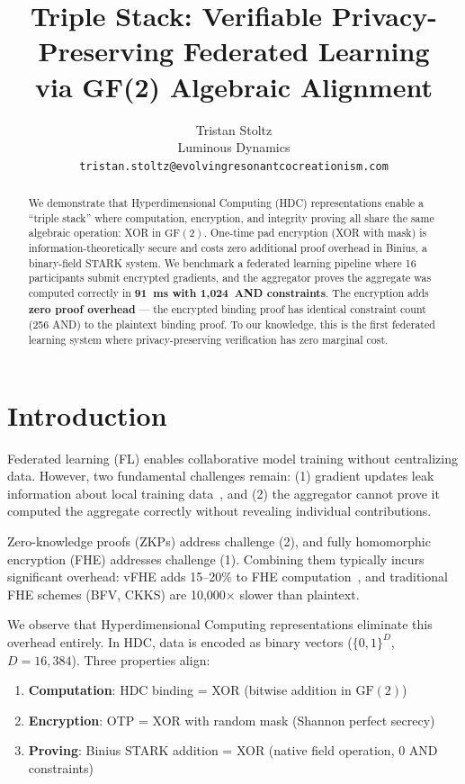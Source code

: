 \documentclass[11pt]{article}
\title{Triple Stack: Verifiable Privacy-Preserving Federated Learning\\via GF(2) Algebraic Alignment}
\author{
Tristan Stoltz\\
Luminous Dynamics\\
\texttt{tristan.stoltz@evolvingresonantcocreationism.com}
}
\begin{document}
\maketitle

\begin{abstract}
We demonstrate that Hyperdimensional Computing (HDC) representations enable a ``triple stack'' where computation, encryption, and integrity proving all share the same algebraic operation: XOR in $\mathrm{GF}(2)$. One-time pad encryption (XOR with mask) is information-theoretically secure and costs zero additional proof overhead in Binius, a binary-field STARK system. We benchmark a federated learning pipeline where 16 participants submit encrypted gradients, and the aggregator proves the aggregate was computed correctly in \textbf{91~ms with 1,024~AND constraints}. The encryption adds \textbf{zero proof overhead} --- the encrypted binding proof has identical constraint count (256 AND) to the plaintext binding proof. To our knowledge, this is the first federated learning system where privacy-preserving verification has zero marginal cost.
\end{abstract}

\section{Introduction}

Federated learning (FL) enables collaborative model training without centralizing data. However, two fundamental challenges remain: (1) gradient updates leak information about local training data~\cite{bonawitz2017practical}, and (2) the aggregator cannot prove it computed the aggregate correctly without revealing individual contributions.

Zero-knowledge proofs (ZKPs) address challenge (2), and fully homomorphic encryption (FHE) addresses challenge (1). Combining them typically incurs significant overhead: vFHE adds 15--20\% to FHE computation~\cite{vfhe2023}, and traditional FHE schemes (BFV, CKKS) are 10,000$\times$ slower than plaintext.

We observe that Hyperdimensional Computing representations eliminate this overhead entirely. In HDC, data is encoded as binary vectors ($\{0,1\}^D$, $D = 16{,}384$). Three properties align:

\begin{enumerate}
    \item \textbf{Computation}: HDC binding = XOR (bitwise addition in $\mathrm{GF}(2)$)
    \item \textbf{Encryption}: OTP = XOR with random mask (Shannon perfect secrecy)
    \item \textbf{Proving}: Binius STARK addition = XOR (native field operation, 0 AND constraints)
\end{enumerate}
\end{document}
